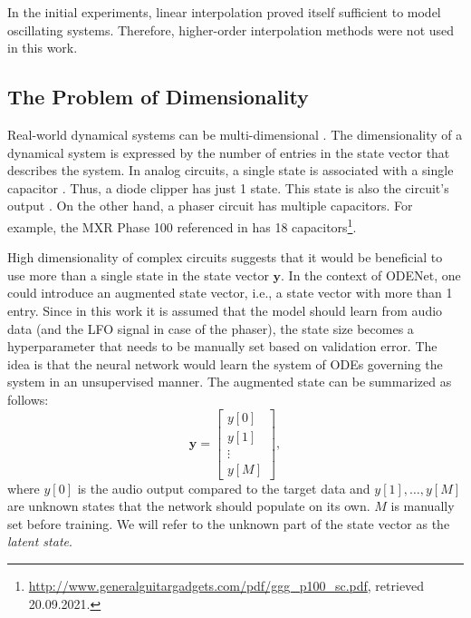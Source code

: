 In the initial experiments, linear interpolation proved itself sufficient to model oscillating systems. Therefore, higher-order interpolation methods were not used in this work.

\subsection{The Problem of Dimensionality}
\label{subsec:dimensionality}
Real-world dynamical systems can be multi-dimensional \cite{Scheinerman1996}. The dimensionality of a dynamical system is expressed by the number of entries in the state vector that describes the system. In analog circuits, a single state is associated with a single capacitor \cite{Parker2019}. Thus, a diode clipper has just 1 state. This state is also the circuit's output \cite{Parker2019}. On the other hand, a phaser circuit has multiple capacitors. For example, the MXR Phase 100 referenced in \cite{Kiiski2016} has 18 capacitors\footnote{\url{http://www.generalguitargadgets.com/pdf/ggg_p100_sc.pdf}, retrieved 20.09.2021.}.

High dimensionality of complex circuits suggests that it would be beneficial to use more than a single state in the state vector $\pmb{y}$. In the context of ODENet, one could introduce an augmented state vector, i.e., a state vector with more than 1 entry. Since in this work it is assumed that the model should learn from audio data (and the LFO signal in case of the phaser), the state size becomes a hyperparameter that needs to be manually set based on validation error. The idea is that the neural network would learn the system of \acp{ODE} governing the system in an unsupervised manner. The augmented state can be summarized as follows:
\begin{equation}
  \pmb{y} = \begin{bmatrix}
    y[0] \\
    y[1] \\
    \vdots \\
    y[M]
  \end{bmatrix},
\end{equation}
where $y[0]$ is the audio output compared to the target data and $y[1], \dots, y[M]$ are unknown states that the network should populate on its own. $M$ is manually set before training. We will refer to the unknown part of the state vector as the \emph{latent state}.

